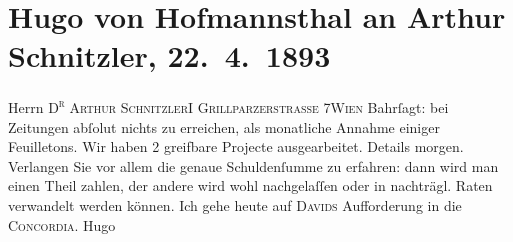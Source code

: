 

         
         \renewcommand{\erwaehntePersonen}{Personen: Hermann Bahr, Jakob Julius David, Hugo von Hofmannsthal}
         \renewcommand{\erwaehnteInstitutionen}{Institutionen: Concordia}
         \renewcommand{\erwaehnteOrte}{Orte: Grillparzerstraße, III., Landstraße, Wien}
         \renewcommand{\erwaehnteWerke}{}
               \section[Hugo von Hofmannsthal an Arthur Schnitzler, 22. 4. 1893]{ Hugo von Hofmannsthal an Arthur Schnitzler, 22. 4. 1893}\nopagebreak{}\rehead{ }\begin{ledgroupsized}[t]{13cm}\normalsize\beginnumbering \toendnotes[C]{\smallbreak\pagebreak[2]} 
\pstart{}{\pb}Herrn \textsc{D\textsuperscript{r}{ } Arthur Schnitzler}\pend{}\pstart{}\textsc{I Grillparzerstrasse 7}\pend{}\pstart{}\textsc{Wien}\pend{}{\bigskip}\pstart
           \noindent{}{\pb}Bahrſagt: bei Zeitungen abſolut nichts zu erreichen,
               als monatliche Annahme einiger Feuilletons. Wir haben 2 greifbare Projecte
               ausgearbeitet. Details morgen. Verlangen Sie vor allem die genaue Schuldenſumme zu
               erfahren: dann wird man einen Theil zahlen, der andere wird wohl nachgelaſſen oder in
               nachträgl. Raten verwandelt werden können. Ich gehe heute auf \textsc{Davids} Aufforderung in die \textsc{Concordia}.\pend
           \pstart \spacefill\mbox{Hugo}\pend{}
         
         \endnumbering{}\end{ledgroupsized}  \newcommand{\dateiname}{L00201}\newcommand{\titel}{Hugo von Hofmannsthal an Arthur Schnitzler, 22. 4. 1893}\newcommand{\editorInnen}{ Martin Anton Müller und Gerd-Hermann Susen}
      